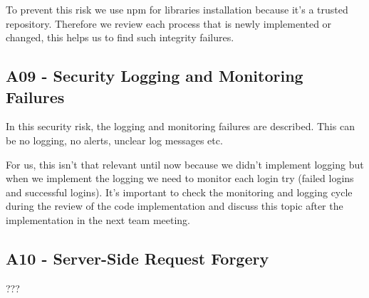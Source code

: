 To prevent this risk we use npm for libraries installation because it's a trusted repository. Therefore we review each process that is newly implemented or changed, this helps us to find such integrity failures.

\subsection{A09 - Security Logging and Monitoring Failures}
In this security risk, the logging and monitoring failures are described. This can be no logging, no alerts, unclear log messages etc.

For us, this isn't that relevant until now because we didn't implement logging but when we implement the logging we need to monitor each login try (failed logins and successful logins). It's important to check the monitoring and logging cycle during the review of the code implementation and discuss this topic after the implementation in the next team meeting.

\subsection{A10 - Server-Side Request Forgery}
???